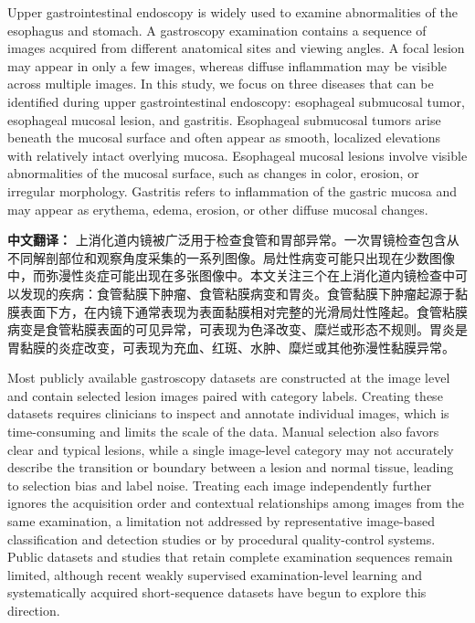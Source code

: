 \documentclass[Afour,sagev,times]{sagej}
\begin{document}
Upper gastrointestinal endoscopy is widely used to examine abnormalities of the esophagus and stomach. A gastroscopy examination contains a sequence of images acquired from different anatomical sites and viewing angles. A focal lesion may appear in only a few images, whereas diffuse inflammation may be visible across multiple images. In this study, we focus on three diseases that can be identified during upper gastrointestinal endoscopy: esophageal submucosal tumor, esophageal mucosal lesion, and gastritis. Esophageal submucosal tumors arise beneath the mucosal surface and often appear as smooth, localized elevations with relatively intact overlying mucosa. Esophageal mucosal lesions involve visible abnormalities of the mucosal surface, such as changes in color, erosion, or irregular morphology. Gastritis refers to inflammation of the gastric mucosa and may appear as erythema, edema, erosion, or other diffuse mucosal changes.

\noindent\textbf{中文翻译：}
上消化道内镜被广泛用于检查食管和胃部异常。一次胃镜检查包含从不同解剖部位和观察角度采集的一系列图像。局灶性病变可能只出现在少数图像中，而弥漫性炎症可能出现在多张图像中。本文关注三个在上消化道内镜检查中可以发现的疾病：食管黏膜下肿瘤、食管粘膜病变和胃炎。食管黏膜下肿瘤起源于黏膜表面下方，在内镜下通常表现为表面黏膜相对完整的光滑局灶性隆起。食管粘膜病变是食管粘膜表面的可见异常，可表现为色泽改变、糜烂或形态不规则。胃炎是胃黏膜的炎症改变，可表现为充血、红斑、水肿、糜烂或其他弥漫性黏膜异常。

Most publicly available gastroscopy datasets are constructed at the image level and contain selected lesion images paired with category labels. Creating these datasets requires clinicians to inspect and annotate individual images, which is time-consuming and limits the scale of the data. Manual selection also favors clear and typical lesions, while a single image-level category may not accurately describe the transition or boundary between a lesion and normal tissue, leading to selection bias and label noise. Treating each image independently further ignores the acquisition order and contextual relationships among images from the same examination, a limitation not addressed by representative image-based classification and detection studies or by procedural quality-control systems. Public datasets and studies that retain complete examination sequences remain limited, although recent weakly supervised examination-level learning and systematically acquired short-sequence datasets have begun to explore this direction.
\end{document}
